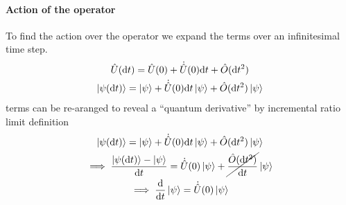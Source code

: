 \begin{multicols}{3}
  \paragraph{\textbf{Action of the operator}}
  To find the action over the operator we expand the terms over an infinitesimal time step.
  \begin{equation*}
    \begin{gathered}
      \hat{U}(\text{d}t) = \hat{U}(0) + \dot{\hat{U}}(0)\text{d}t + \hat{O}(\text{d}t^2) \\
      \ket{\psi(\text{d}t)} = \ket\psi + \dot{\hat{U}}(0)\text{d}t\ket\psi + \hat{O}(\text{d}t^2)\ket\psi
    \end{gathered}
  \end{equation*}
  terms can be re-aranged to reveal a ``quantum derivative'' by incremental ratio limit definition
  \begin{equation*}
    \begin{gathered}
      \ket{\psi(\text{d}t)} = \ket\psi + \dot{\hat{U}}(0)\text{d}t\ket\psi + \hat{O}(\text{d}t^2)\ket\psi \\
      \implies \frac{\ket{\psi(\text{d}t)} - \ket\psi}{\text{d}t} = \dot{\hat{U}}(0)\ket\psi + \cancel{\frac{\hat{O}(\text{d}t^2)}{\text{d}t}}\ket\psi \\
      \implies \dv{t}\ket\psi = \dot{\hat{U}}(0)\ket\psi
    \end{gathered}
  \end{equation*} \\


\end{multicols}
